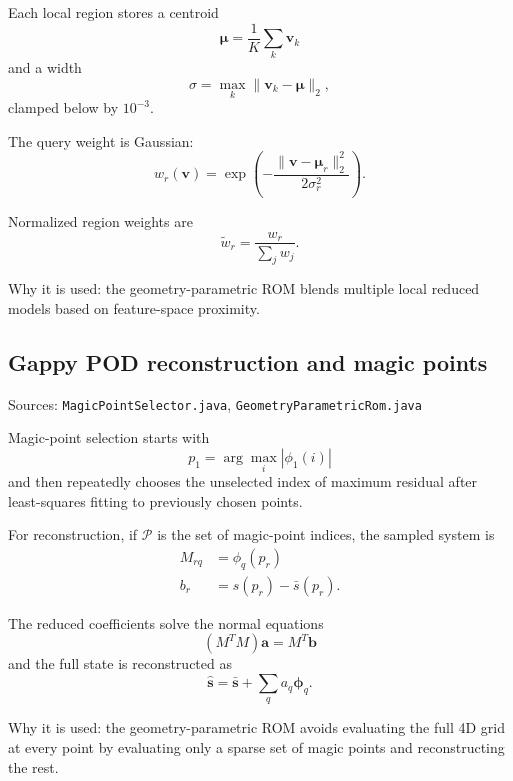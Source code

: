 \documentclass[11pt]{article}
\begin{document}
Each local region stores a centroid
\begin{equation*}
\boldsymbol{\mu} = \frac{1}{K}\sum_k \mathbf v_k
\end{equation*}
and a width
\begin{equation*}
\sigma = \max_k \|\mathbf v_k - \boldsymbol{\mu}\|_2,
\end{equation*}
clamped below by $10^{-3}$.

The query weight is Gaussian:
\begin{equation*}
w_r(\mathbf v) = \exp\!\left(-\frac{\|\mathbf v-\boldsymbol{\mu}_r\|_2^2}{2\sigma_r^2}\right).
\end{equation*}

Normalized region weights are
\begin{equation*}
\tilde w_r = \frac{w_r}{\sum_j w_j}.
\end{equation*}

Why it is used: the geometry-parametric ROM blends multiple local reduced models based on feature-space proximity.

\subsection{Gappy POD reconstruction and magic points}
Sources: \texttt{MagicPointSelector.java}, \texttt{GeometryParametricRom.java}

Magic-point selection starts with
\begin{equation*}
p_1 = \arg\max_i |\phi_1(i)|
\end{equation*}
and then repeatedly chooses the unselected index of maximum residual after least-squares fitting to previously chosen points.

For reconstruction, if $\mathcal P$ is the set of magic-point indices, the sampled system is
\begin{align*}
M_{rq} &= \phi_q(p_r) \\
b_r &= s(p_r) - \bar s(p_r).
\end{align*}

The reduced coefficients solve the normal equations
\begin{equation*}
(M^TM)\mathbf a = M^T\mathbf b
\end{equation*}
and the full state is reconstructed as
\begin{equation*}
\hat{\mathbf s} = \bar{\mathbf s} + \sum_q a_q \boldsymbol{\phi}_q.
\end{equation*}

Why it is used: the geometry-parametric ROM avoids evaluating the full 4D grid at every point by evaluating only a sparse set of magic points and reconstructing the rest.
\end{document}
